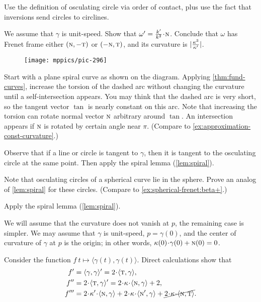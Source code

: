 \begin{multicols}{2}
Use the definition of osculating circle via order of contact, plus use the fact that inversions send circles to circlines. 

We assume that $\gamma$ is unit-speed.
Show that $\omega'=\tfrac{\skur'}{\skur^2}\cdot \norm$. 
Conclude that $\omega$ has Frenet frame either $(\text{\sc{n}},-\text{\sc{t}})$ or $(-\text{\sc{n}},\text{\sc{t}})$, and its curvature is $|\tfrac{\kappa^3}{\kappa'}|$.

\begin{wrapfigure}{r}{15 mm}
\vskip-5mm
\centering
\texttt{[image: mppics/pic-296]}
\vskip-3mm
\end{wrapfigure}

Start with a plane spiral curve as shown on the diagram.
Applying \ref{thm:fund-curves}, increase the torsion of the dashed arc without changing the curvature until a self-intersection appears.
You may think that the dashed arc is very short, so the tangent vector $\tan$ is nearly constant on this arc. 
Note that increasing the torsion can rotate normal vector $\text{\sc{n}}$ arbitrary around $\tan$.
An intersection appears if $\text{\sc{n}}$ is rotated by certain angle near $\pi$.
(Compare to \ref{ex:approximation-const-curvature}.)

Observe that if a line or circle is tangent to $\gamma$,
then it is tangent to the osculating circle at the same point.
Then apply the spiral lemma (\ref{lem:spiral}).

Note that osculating circles of a spherical curve lie in the sphere.
Prove an analog of \ref{lem:spiral} for these circles.
(Compare to \ref{ex:spherical-frenet:beta+}.)



\setcounter{eqtn}{0}

Apply the spiral lemma (\ref{lem:spiral}).

We will assume that the curvature does not vanish at $p$, the remaining case is simpler.
We may assume that $\gamma$ is unit-speed, $p=\gamma(0)$,
and the center of curvature of $\gamma$ at $p$ is the origin;
in other words, $\kur(0)\cdot\gamma(0)+ \norm(0)=0$.

Consider the function $f\:t\mapsto \langle\gamma(t),\gamma(t)\rangle$.
Direct calculations show that 
\begin{align*}
f'
&=\langle\gamma,\gamma\rangle'
=2\cdot\langle\tan,\gamma\rangle,
\\
f''
&=2\cdot\langle\tan,\gamma\rangle'
=2\cdot\kur\cdot\langle\norm,\gamma\rangle+2,
\\
f'''
&=2\cdot\kur'\cdot\langle\norm,\gamma\rangle
+2\cdot\kur\cdot\langle\norm',\gamma\rangle+\cancel{2\cdot\kur\cdot\langle\norm,\tan\rangle}.
\end{align*}


\end{multicols}

